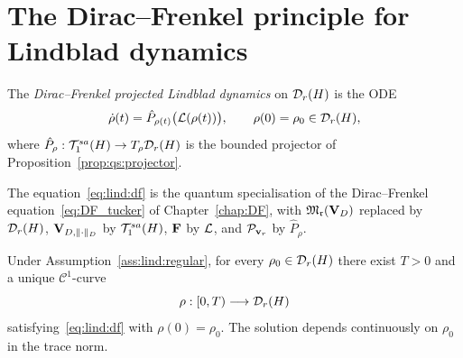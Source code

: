 \section{The Dirac--Frenkel principle for Lindblad dynamics}
\label{sec:lind:df}

\begin{definition}
\label{def:lind:df}
The \emph{Dirac--Frenkel projected Lindblad dynamics} on $\mathcal{D}_{r}(H)$
is the ODE
\begin{equation}
\label{eq:lind:df}
    \dot\rho(t) = \hat{P}_{\rho(t)}\bigl(\mathcal{L}(\rho(t))\bigr),
    \qquad \rho(0) = \rho_0 \in \mathcal{D}_{r}(H),
\end{equation}
where $\hat{P}_\rho: \mathcal{T}_{1}^{sa}(H) \to T_\rho \mathcal{D}_{r}(H)$ is the
bounded projector of Proposition~\ref{prop:qs:projector}.
\end{definition}

The equation~\eqref{eq:lind:df} is the quantum specialisation of the
Dirac--Frenkel equation~\eqref{eq:DF_tucker} of Chapter~\ref{chap:DF},
with $\mathfrak{M}_{\mathfrak{r}}(\mathbf{V}_D)$ replaced by $\mathcal{D}_{r}(H)$, $\mathbf{V}_{D,\|\cdot\|_D}$ by
$\mathcal{T}_{1}^{sa}(H)$, $\mathbf{F}$ by $\mathcal{L}$, and $\mathcal{P}_{\mathbf{v}_r}$ by $\hat{P}_\rho$.

\begin{theorem}
\label{thm:lind:wellposed}
Under Assumption~\ref{ass:lind:regular}, for every
$\rho_0 \in \mathcal{D}_{r}(H)$ there exist $T > 0$ and a unique
$\mathcal{C}^1$-curve
\begin{equation*}
    \rho: [0, T) \longrightarrow \mathcal{D}_{r}(H)
\end{equation*}
satisfying~\eqref{eq:lind:df} with $\rho(0) = \rho_0$.
The solution depends continuously on $\rho_0$ in the trace norm.
\end{theorem}

